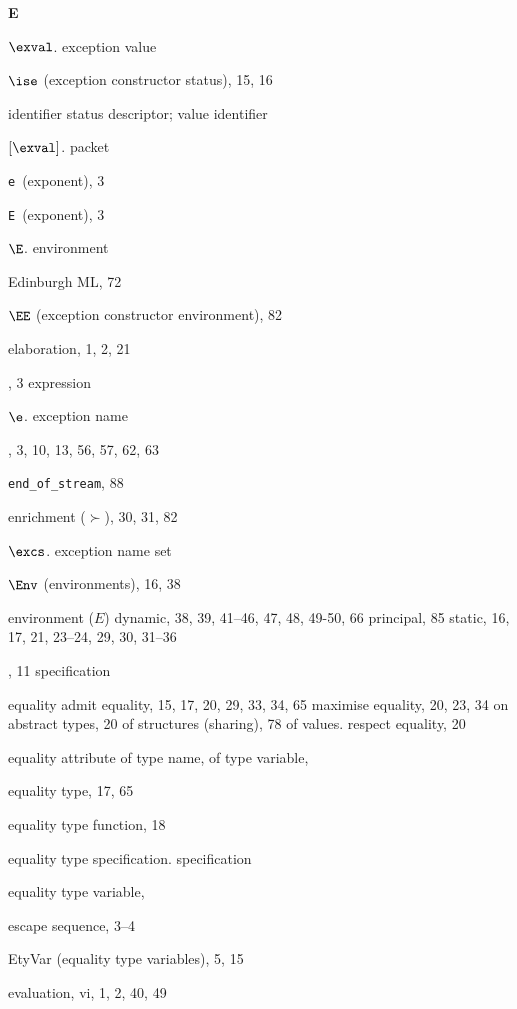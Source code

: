 \begin{theindex}
\indexspace
\parbox{64mm}{\hfil{\large\bf E}\hfil}
\indexspace
\item $\exval$. \see exception value
\item $\ise$ (exception constructor status), 15, 16
\item \seealso identifier status descriptor; value identifier
\item $[\exval]$. \see packet 
\item \verb+e+\ (exponent), 3
\item \verb+E+\ (exponent), 3
\item $\E$. \see environment 
\item Edinburgh ML, 72
\item $\EE$ (exception constructor environment), 82
\item elaboration, 1, 2, 21
\item \ELSE, 3
\subitem \seealso expression
\item $\e$. \see exception name
\item \END, 3, 10, 13, 56, 57, 62, 63
\item \verb+end_of_stream+, 88
\item enrichment ($\succ$), 30, 31, 82
\item $\excs$. \see exception name set
\item $\Env$ (environments), 16, 38
\item environment ($E$)
\subitem dynamic, 38, 39, 41--46, 47, 48, 49-50, 66
\subitem principal, 85
\subitem static, 16, 17, 21, 23--24, 29, 30, 31--36
\item \EQTYPE, 11
\subitem \seealso specification
\item equality 
\subitem admit equality, 15, 17, 20, 29, 33, 34, 65
\subitem maximise equality, 20, 23, 34
\subitem on abstract types, 20
\subitem of structures (sharing), 78
\subitem of values. \see \boxml{=}
\subitem respect equality, 20
\item equality attribute 
\subitem of type name, \eqtynamerefs
\subitem of type variable, \eqtyvarrefs
\item equality type, 17, 65
\item equality type function, 18
\item equality type specification. \see specification
\item equality type variable, \eqtyvarrefs
\item escape sequence, 3--4
\item EtyVar (equality type variables), 5, 15 
\item evaluation, vi, 1, 2, 40, 49

\end{theindex}
